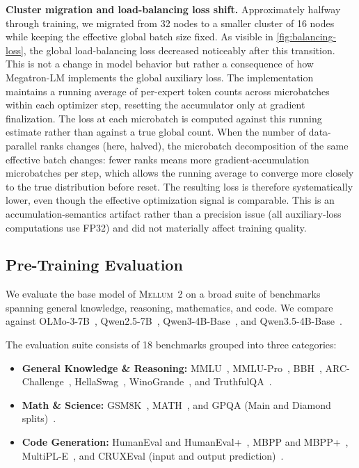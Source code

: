 \documentclass{llmxive}
\providecommand{\modelname}{\textsc{Mellum~2}\xspace}
\begin{document}
\textbf{Cluster migration and load-balancing loss shift.}
Approximately halfway through training, we migrated from 32 nodes to a
smaller cluster of 16 nodes while keeping the effective global batch size
fixed. As visible in \cref{fig:balancing-loss}, the global load-balancing
loss decreased noticeably after this transition. This is not a change in
model behavior but rather a consequence of how Megatron-LM implements the
global auxiliary loss. The implementation maintains a running average of
per-expert token counts across microbatches within each optimizer step,
resetting the accumulator only at gradient finalization. The loss at each
microbatch is computed against this running estimate rather than against a
true global count. When the number of data-parallel ranks changes (here,
halved), the microbatch decomposition of the same effective batch changes:
fewer ranks means more gradient-accumulation microbatches per step, which
allows the running average to converge more closely to the true distribution
before reset. The resulting loss is therefore systematically lower, even
though the effective optimization signal is comparable. This is an
accumulation-semantics artifact rather than a precision issue (all
auxiliary-loss computations use FP32) and did not materially affect
training quality.

\subsection{Pre-Training Evaluation}
\label{sec:pretrain-eval}

We evaluate the base model of \modelname on a broad suite of benchmarks
spanning general knowledge, reasoning, mathematics, and code. We compare against OLMo-3-7B~\cite{olmo3},
Qwen2.5-7B~\cite{qwen2.5}, Qwen3-4B-Base~\cite{yang2025qwen3}, and Qwen3.5-4B-Base~\cite{qwen2026qwen35}.

The evaluation suite consists of 18 benchmarks grouped into three categories:
\begin{itemize}
  \item \textbf{General Knowledge \& Reasoning:} MMLU~\cite{hendrycks2021mmlu},
    MMLU-Pro~\cite{wang2024mmlupro}, BBH~\cite{suzgun2022bbh},
    ARC-Challenge~\cite{clark2018arc}, HellaSwag~\cite{zellers2019hellaswag},
    WinoGrande~\cite{sakaguchi2021winogrande}, and
    TruthfulQA~\cite{lin2022truthfulqa}.
  \item \textbf{Math \& Science:} GSM8K~\cite{cobbe2021gsm8k},
    MATH~\cite{hendrycks2021math}, and GPQA (Main and Diamond
    splits)~\cite{rein2023gpqa}.
  \item \textbf{Code Generation:} HumanEval and HumanEval+~\cite{chen2021humaneval,liu2023evalplus},
    MBPP and MBPP+~\cite{austin2021mbpp,liu2023evalplus},
    MultiPL-E~\cite{cassano2022multipl}, and
    CRUXEval (input and output prediction)~\cite{gu2024cruxeval}.
\end{itemize}
\end{document}
